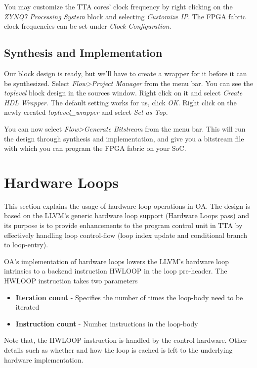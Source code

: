 \documentclass[a4paper,twoside]{tceusermanual}
\begin{document}
You may customize the TTA cores' clock frequency by right clicking on the
\textit{ZYNQ7 Processing System} block and selecting \textit{Customize IP}.
The FPGA fabric clock frequencies can be set under \textit{Clock Configuration}.

\subsection{Synthesis and Implementation}

Our block design is ready, but we'll have to create a wrapper for it before
it can be synthesized. Select \textit{Flow>Project Manager} from the menu bar.
You can see the \textit{toplevel} block design in the sources window. Right
click on it and select \textit{Create HDL Wrapper}. The default setting works
for us, click \textit{OK}. Right click on the newly created
\textit{toplevel\_wrapper} and select \textit{Set as Top}.

You can now select \textit{Flow>Generate Bitstream} from the menu bar. This will
run the design through synthesis and implementation, and give you a bitstream
file with which you can program the FPGA fabric on your SoC.

\section{Hardware Loops}
\label{section:hwloops}

This section explains the usage of hardware loop operations in OA. The design
is based on the LLVM's generic hardware loop support (Hardware Loops pass)
and its purpose is to provide enhancements to the program control unit in
TTA by effectively handling loop control-flow (loop index update and conditional
branch to loop-entry).

OA's implementation of hardware loops lowers the LLVM's hardware loop
intrinsics to a backend instruction HWLOOP in the loop pre-header. The
HWLOOP instruction takes two parameters
\begin{itemize}
\item \textbf{Iteration count} - Specifies the number of times the loop-body
    need to be iterated
\item \textbf{Instruction count} - Number instructions in the loop-body
\end{itemize}

Note that, the HWLOOP instruction is handled by the control hardware. Other
details such as whether and how the loop is cached is left to the underlying
hardware implementation.
\end{document}
